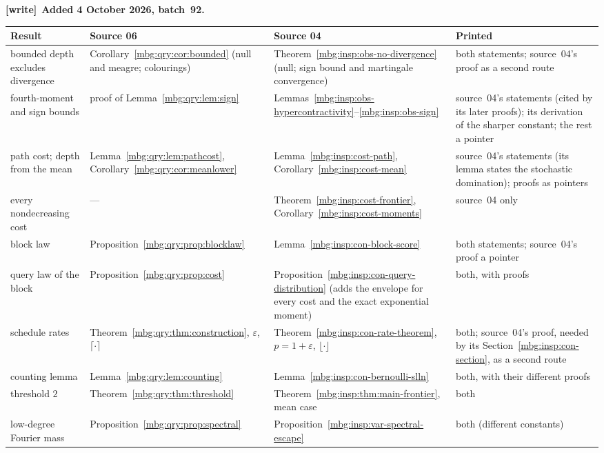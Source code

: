 \documentclass[11pt,letterpaper]{article}
\theoremstyle{definition}
\newenvironment{writenote}[1][]{\par\smallskip\begingroup\small
 \noindent\textbf{[write]}\if\relax\detokenize{#1}\relax\else~\textbf{#1.}\fi\ }%
 {\par\endgroup\smallskip}
\begin{document}
\begin{writenote}[Added 4 October 2026, batch~92]
\begin{center}\small
\begin{tabular}{>{\raggedright\arraybackslash}p{}>{\raggedright\arraybackslash}p{}>{\raggedright\arraybackslash}p{}>{\raggedright\arraybackslash}p{}}
\toprule
Result & Source 06 & Source 04 & Printed\\
\midrule
bounded depth excludes divergence & Corollary~\ref{mbg:qry:cor:bounded} (null and meagre; colourings) & Theorem~\ref{mbg:insp:obs-no-divergence} (null; sign bound and martingale convergence) & both statements; source~04's proof as a second route\\
fourth-moment and sign bounds & proof of Lemma~\ref{mbg:qry:lem:sign} & Lemmas~\ref{mbg:insp:obs-hypercontractivity}--\ref{mbg:insp:obs-sign} & source~04's statements (cited by its later proofs); its derivation of the sharper constant; the rest a pointer\\
path cost; depth from the mean & Lemma~\ref{mbg:qry:lem:pathcost}, Corollary~\ref{mbg:qry:cor:meanlower} & Lemma~\ref{mbg:insp:cost-path}, Corollary~\ref{mbg:insp:cost-mean} & source~04's statements (its lemma states the stochastic domination); proofs as pointers\\
every nondecreasing cost & --- & Theorem~\ref{mbg:insp:cost-frontier}, Corollary~\ref{mbg:insp:cost-moments} & source~04 only\\
block law & Proposition~\ref{mbg:qry:prop:blocklaw} & Lemma~\ref{mbg:insp:con-block-score} & both statements; source~04's proof a pointer\\
query law of the block & Proposition~\ref{mbg:qry:prop:cost} & Proposition~\ref{mbg:insp:con-query-distribution} (adds the envelope for every cost and the exact exponential moment) & both, with proofs\\
schedule rates & Theorem~\ref{mbg:qry:thm:construction}, $\varepsilon$, $\lceil\cdot\rceil$ & Theorem~\ref{mbg:insp:con-rate-theorem}, $p=1+\varepsilon$, $\lfloor\cdot\rfloor$ & both; source~04's proof, needed by its Section~\ref{mbg:insp:con-section}, as a second route\\
counting lemma & Lemma~\ref{mbg:qry:lem:counting} & Lemma~\ref{mbg:insp:con-bernoulli-slln} & both, with their different proofs\\
threshold $2$ & Theorem~\ref{mbg:qry:thm:threshold} & Theorem~\ref{mbg:insp:thm:main-frontier}, mean case & both\\
low-degree Fourier mass & Proposition~\ref{mbg:qry:prop:spectral} & Proposition~\ref{mbg:insp:var-spectral-escape} & both (different constants)\\

\end{tabular}
\end{center}
\end{writenote}
\end{document}
